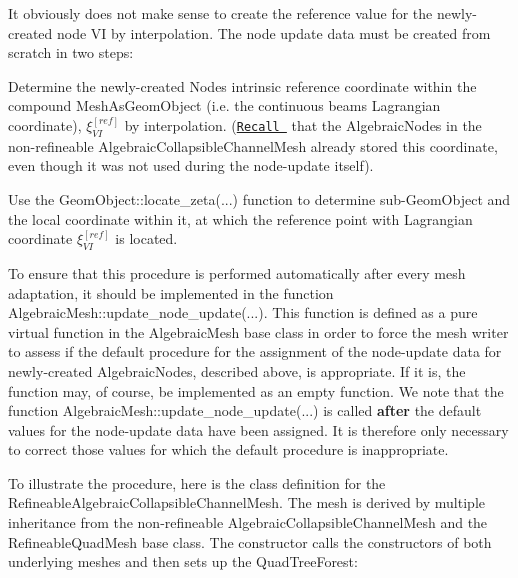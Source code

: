 It obviously does not make sense to create the reference value for the newly-\/created node VI by interpolation. The node update data must be created from scratch in two steps\+:
\begin{DoxyEnumerate}
\item Determine the newly-\/created Node\textquotesingle{}s intrinsic reference coordinate within the compound {\ttfamily Mesh\+As\+Geom\+Object} (i.\+e. the continuous beam\textquotesingle{}s Lagrangian coordinate), $ \xi_{VI}^{[ref]}$ by interpolation. (\href{../../fsi_collapsible_channel_algebraic/html/index.html}{\tt Recall } that the {\ttfamily Algebraic\+Nodes} in the non-\/refineable {\ttfamily Algebraic\+Collapsible\+Channel\+Mesh} already stored this coordinate, even though it was not used during the node-\/update itself). ~\newline
~\newline

\item Use the {\ttfamily Geom\+Object\+::locate\+\_\+zeta}(...) function to determine sub-\/{\ttfamily Geom\+Object} and the local coordinate within it, at which the reference point with Lagrangian coordinate $ \xi_{VI}^{[ref]}$ is located.
\end{DoxyEnumerate}To ensure that this procedure is performed automatically after every mesh adaptation, it should be implemented in the function {\ttfamily Algebraic\+Mesh\+::update\+\_\+node\+\_\+update}(...). This function is defined as a pure virtual function in the {\ttfamily Algebraic\+Mesh} base class in order to force the mesh writer to assess if the default procedure for the assignment of the node-\/update data for newly-\/created {\ttfamily Algebraic\+Nodes}, described above, is appropriate. If it is, the function may, of course, be implemented as an empty function. We note that the function {\ttfamily Algebraic\+Mesh\+::update\+\_\+node\+\_\+update}(...) is called {\bfseries after} the default values for the node-\/update data have been assigned. It is therefore only necessary to correct those values for which the default procedure is inappropriate.

To illustrate the procedure, here is the class definition for the {\ttfamily Refineable\+Algebraic\+Collapsible\+Channel\+Mesh}. The mesh is derived by multiple inheritance from the non-\/refineable {\ttfamily Algebraic\+Collapsible\+Channel\+Mesh} and the {\ttfamily Refineable\+Quad\+Mesh} base class. The constructor calls the constructors of both underlying meshes and then sets up the {\ttfamily Quad\+Tree\+Forest\+:} 

